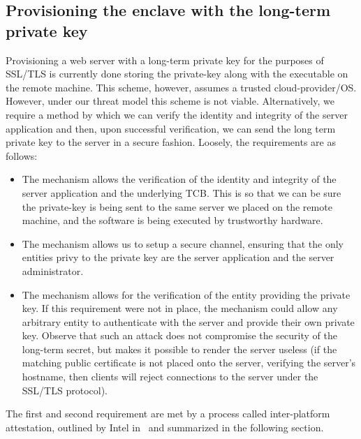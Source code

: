 \documentclass[../main.tex]{subfiles}
\begin{document}
\subsection{Provisioning the enclave with the long-term private key}
Provisioning a web server with a long-term private key for the purposes of SSL/TLS is currently done storing the private-key along with the executable on 
the remote machine. This scheme, however, assumes a trusted cloud-provider/OS. However, under our threat model this scheme is not viable. Alternatively,
we require a method by which we can verify the identity and integrity of the server application and then, upon successful verification, we can 
send the long term private key to the server in a secure fashion. Loosely, the requirements are as follows:
\begin{itemize}
	\item The mechanism allows the verification of the identity and integrity of the server application and the underlying TCB.
	      This is so that we can be sure the private-key is being sent to the same server we placed on the remote machine, and the software is being executed by
	      trustworthy hardware.
	\item The mechanism allows us to setup a secure channel, ensuring that the only entities privy to the private key 
	      are the server application and the server administrator.
	\item The mechanism allows for the verification of the entity providing the private key. If this requirement were not in place, the mechanism could allow any arbitrary entity to authenticate with the server and provide their own private key. Observe that such an attack does not compromise
	the security of the long-term secret, but makes it possible to render the server useless (if the matching public certificate is not placed onto the server, verifying the server's hostname, then clients will reject connections to the server under the SSL/TLS protocol). %
\end{itemize} 
The first and second requirement are met by a process called inter-platform attestation, outlined by Intel in~\cite{IntelCorporation2010} and summarized in the following section.
\end{document}
